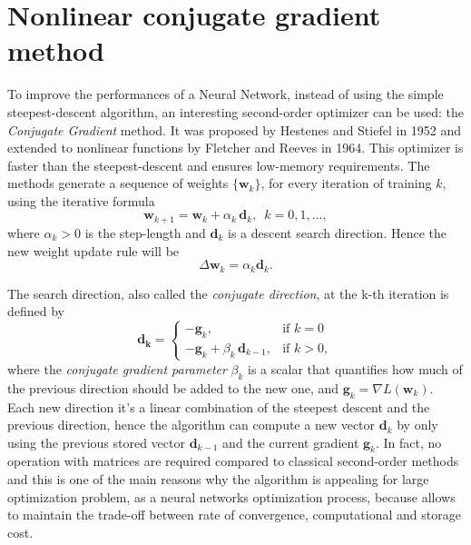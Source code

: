 \documentclass[11pt]{article}
\begin{document}
\section{Nonlinear conjugate gradient method}
\label{sec:NCG}
To improve the performances of a Neural Network, instead of using the simple steepest-descent algorithm, an interesting second-order optimizer can be used: the \emph{Conjugate Gradient} method. It was proposed by Hestenes and Stiefel \cite{Hestenes1952} in 1952 and extended to nonlinear functions by Fletcher and Reeves \cite{Fletcher1964} in 1964. This optimizer is faster than the steepest-descent and ensures low-memory requirements. The methods generate a sequence of weights $\{ \mathbf{w}_k \}$, for every iteration of training $k$, using the iterative formula
\begin{equation}
\label{eq:ncg_updat_formula}
    \mathbf{w}_{k+1}=\mathbf{w}_k + \alpha_k \, \mathbf{d}_k, \,\,\, k=0,1,...,
\end{equation}
where $\alpha_k > 0$ is the step-length and $\mathbf{d}_k$ is a descent search direction. Hence the new weight update rule will be
\begin{equation}
    \Delta \mathbf{w}_k = \alpha_k \mathbf{d}_k.
\end{equation}

\noindent The search direction, also called the \emph{conjugate direction}, at the k-th iteration is defined by
\begin{equation}
\label{eq:ncg_direction}
    \mathbf{d_k} = 
    \begin{cases}
        -\mathbf{g}_k, & \text{if } k=0 \\
        -\mathbf{g}_k + \beta_k \,  \mathbf{d}_{k-1}, & \text{if } k>0, 
    \end{cases} 
\end{equation}
 where the \emph{conjugate gradient parameter} $\beta_k$ is a scalar that quantifies how much of the previous direction should be added to the new one, and $\mathbf{g}_k =\nabla L(\textbf{w}_k)$. Each new direction it's a linear combination of the steepest descent and the previous direction, hence the algorithm can compute a new vector $\mathbf{d}_k$ by only using the previous stored vector $\mathbf{d}_{k-1}$ and the current gradient $\mathbf{g}_k$. In fact, no operation with matrices are required compared to classical second-order methods and this is one of the main reasons why the algorithm is appealing for large optimization problem, as a neural networks optimization process, because allows to maintain the trade-off between rate of convergence, computational and storage cost. 
 
\end{document}
